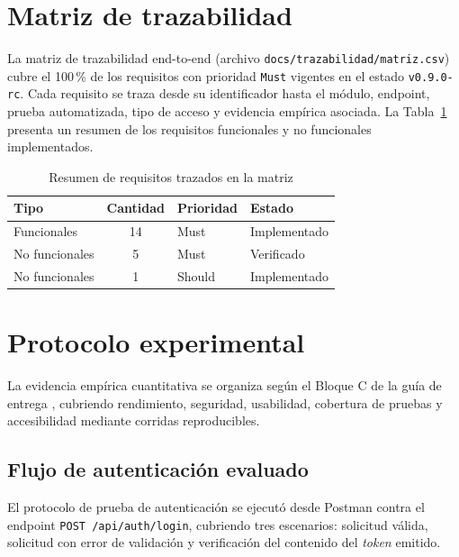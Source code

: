 \documentclass[12pt]{article}
\begin{document}
\section{Matriz de trazabilidad}

La matriz de trazabilidad end-to-end (archivo \texttt{docs/trazabilidad/matriz.csv}) cubre el
100\,\% de los requisitos con prioridad \texttt{Must} vigentes en el estado \texttt{v0.9.0-rc}.
Cada requisito se traza desde su identificador hasta el módulo, endpoint, prueba automatizada,
tipo de acceso y evidencia empírica asociada. La Tabla~\ref{tab:trazabilidad} presenta un
resumen de los requisitos funcionales y no funcionales implementados.

\begin{table}[H]
\centering
\caption{Resumen de requisitos trazados en la matriz}
\label{tab:trazabilidad}
\begin{tabular}{@{}lcll@{}}
\toprule
\textbf{Tipo} & \textbf{Cantidad} & \textbf{Prioridad} & \textbf{Estado} \\
\midrule
Funcionales & 14 & Must & Implementado \\
No funcionales & 5 & Must & Verificado \\
No funcionales & 1 & Should & Implementado \\
\bottomrule
\end{tabular}
\end{table}

\section{Protocolo experimental}

La evidencia empírica cuantitativa se organiza según el Bloque C de la guía de entrega
\cite{uteq2026guia}, cubriendo rendimiento, seguridad, usabilidad, cobertura de pruebas y
accesibilidad mediante corridas reproducibles.

\subsection{Flujo de autenticación evaluado}

El protocolo de prueba de autenticación se ejecutó desde Postman contra el endpoint
\texttt{POST /api/auth/login}, cubriendo tres escenarios: solicitud válida, solicitud con
error de validación y verificación del contenido del \textit{token} emitido.
\end{document}
